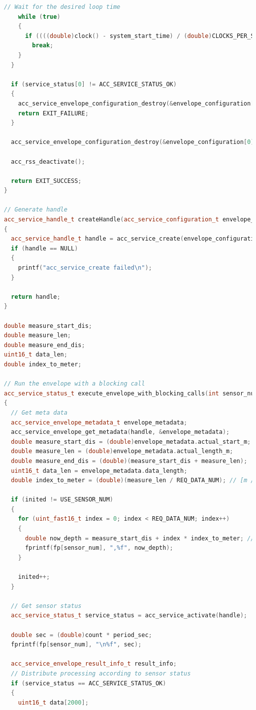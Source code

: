 \begin{lstlisting}[language=c++]
    // Wait for the desired loop time
    while (true)
    {
      if ((((double)clock() - system_start_time) / (double)CLOCKS_PER_SEC) > (double)loop_num * period_sec)
        break;
    }
  }

  if (service_status[0] != ACC_SERVICE_STATUS_OK)
  {
    acc_service_envelope_configuration_destroy(&envelope_configuration[0]);
    return EXIT_FAILURE;
  }

  acc_service_envelope_configuration_destroy(&envelope_configuration[0]);

  acc_rss_deactivate();

  return EXIT_SUCCESS;
}

// Generate handle
acc_service_handle_t createHandle(acc_service_configuration_t envelope_configuration)
{
  acc_service_handle_t handle = acc_service_create(envelope_configuration);
  if (handle == NULL)
  {
    printf("acc_service_create failed\n");
  }

  return handle;
}

double measure_start_dis;
double measure_len;
double measure_end_dis;
uint16_t data_len;
double index_to_meter;

// Run the envelope with a blocking call
acc_service_status_t execute_envelope_with_blocking_calls(int sensor_num, acc_service_handle_t handle)
{
  // Get meta data
  acc_service_envelope_metadata_t envelope_metadata;
  acc_service_envelope_get_metadata(handle, &envelope_metadata);
  double measure_start_dis = (double)envelope_metadata.actual_start_m;
  double measure_len = (double)envelope_metadata.actual_length_m;
  double measure_end_dis = (double)(measure_start_dis + measure_len);
  uint16_t data_len = envelope_metadata.data_length;
  double index_to_meter = (double)(measure_len / REQ_DATA_NUM); // [m / point]

  if (inited != USE_SENSOR_NUM)
  {
    for (uint_fast16_t index = 0; index < REQ_DATA_NUM; index++)
    {
      double now_depth = measure_start_dis + index * index_to_meter; // [m]
      fprintf(fp[sensor_num], ",%f", now_depth);
    }

    inited++;
  }

  // Get sensor status
  acc_service_status_t service_status = acc_service_activate(handle);

  double sec = (double)count * period_sec;
  fprintf(fp[sensor_num], "\n%f", sec);

  acc_service_envelope_result_info_t result_info;
  // Distribute processing according to sensor status
  if (service_status == ACC_SERVICE_STATUS_OK)
  {
    uint16_t data[2000];


\end{lstlisting}
